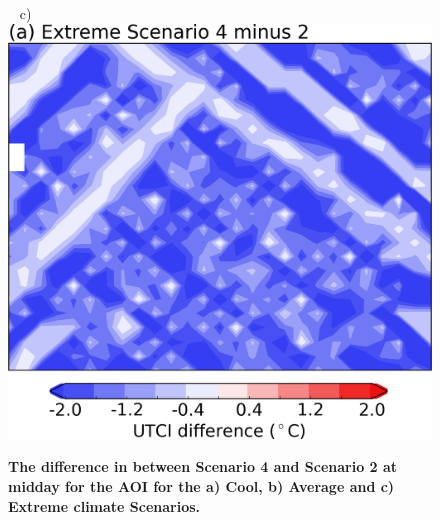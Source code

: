 \documentclass[final,3p,times,authoryear]{elsarticle}
\begin{document}
\begin{figure}[!htbp]
~
c)\includegraphics[scale=0.30,trim = 0mm 0mm 0mm 8mm,clip]{images/fig4c} 
\caption{\bf The difference in  between Scenario 4 and Scenario 2 at midday for the AOI for the a) Cool, b) Average and c) Extreme climate Scenarios.}    
 \label{fig:fig4} 
\end{figure} 
\end{document}

